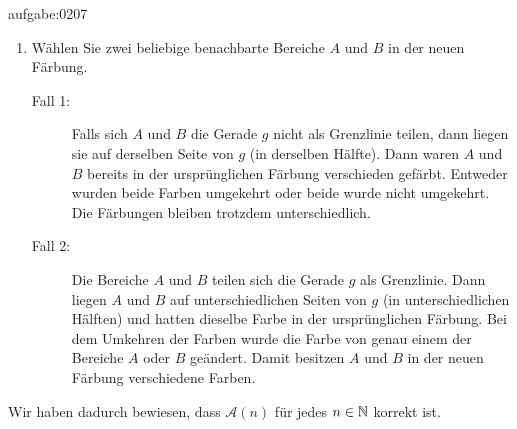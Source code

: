 \begin{antwort}{aufgabe:0207}
\begin{aenum}
\begin{renum}
\begin{enumerate}
                \item Wählen Sie zwei beliebige benachbarte Bereiche $A$ und $B$ in der neuen Färbung.
            \begin{description}
                \item[Fall 1:] Falls sich $A$ und $B$ die Gerade $g$ nicht als Grenzlinie teilen, dann liegen sie auf derselben Seite von $g$ (in derselben Hälfte). Dann waren $A$ und $B$ bereits in der ursprünglichen Färbung verschieden gefärbt. Entweder wurden beide Farben umgekehrt oder beide wurde nicht umgekehrt. Die Färbungen bleiben trotzdem unterschiedlich.
                \item[Fall 2:] Die Bereiche $A$ und $B$ teilen sich die Gerade $g$ als Grenzlinie. Dann liegen $A$ und $B$ auf unterschiedlichen Seiten von $g$ (in unterschiedlichen Hälften) und hatten dieselbe Farbe in der ursprünglichen Färbung. Bei dem Umkehren der Farben wurde die Farbe von genau einem der Bereiche $A$ oder $B$ geändert. Damit besitzen $A$ und $B$ in der neuen Färbung verschiedene Farben.
            \end{description}
            \end{enumerate}
        \end{renum}
\end{aenum}
Wir haben dadurch bewiesen, dass $\mathcal{A}(n)$ für jedes $n\in\mathbb{N}$ korrekt ist.
\end{antwort}

